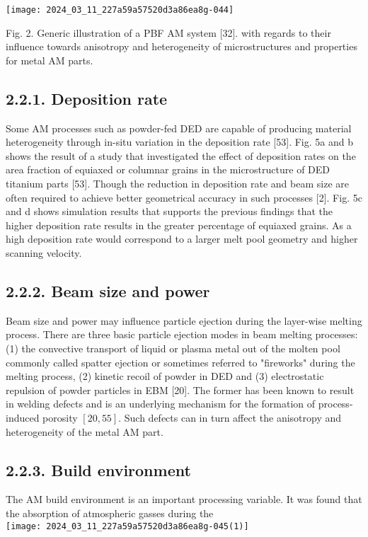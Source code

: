 \documentclass[10pt]{article}
\begin{document}
\begin{center}
\texttt{[image: 2024\_03\_11\_227a59a57520d3a86ea8g-044]}
\end{center}

Fig. 2. Generic illustration of a PBF AM system [32]. with regards to their influence towards anisotropy and heterogeneity of microstructures and properties for metal AM parts.

\subsection*{2.2.1. Deposition rate}
Some AM processes such as powder-fed DED are capable of producing material heterogeneity through in-situ variation in the deposition rate [53]. Fig. 5a and b shows the result of a study that investigated the effect of deposition rates on the area fraction of equiaxed or columnar grains in the microstructure of DED titanium parts [53]. Though the reduction in deposition rate and beam size are often required to achieve better geometrical accuracy in such processes [2]. Fig. 5c and d shows simulation results that supports the previous findings that the higher deposition rate results in the greater percentage of equiaxed grains. As a high deposition rate would correspond to a larger melt pool geometry and higher scanning velocity.

\subsection*{2.2.2. Beam size and power}
Beam size and power may influence particle ejection during the layer-wise melting process. There are three basic particle ejection modes in beam melting processes: (1) the convective transport of liquid or plasma metal out of the molten pool commonly called spatter ejection or sometimes referred to "fireworks" during the melting process, (2) kinetic recoil of powder in DED and (3) electrostatic repulsion of powder particles in EBM [20]. The former has been known to result in welding defects and is an underlying mechanism for the formation of process-induced porosity $[20,55]$. Such defects can in turn affect the anisotropy and heterogeneity of the metal AM part.

\subsection*{2.2.3. Build environment}
The AM build environment is an important processing variable. It was found that the absorption of atmospheric gasses during the\\
\texttt{[image: 2024\_03\_11\_227a59a57520d3a86ea8g-045(1)]}
\end{document}
